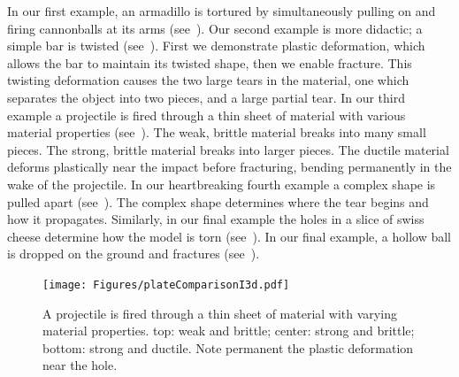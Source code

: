 \documentclass[conference]{acmsiggraph}
\begin{document}
In our first example, an armadillo is tortured by simultaneously pulling on and firing
cannonballs at its arms (see~).
Our second example is more didactic; a simple bar is twisted (see~).  First we demonstrate 
plastic deformation, which allows the bar to maintain its twisted shape, then we enable fracture.  This twisting deformation causes the two large tears in the material, one which separates the object into two pieces, and a large partial tear.
In our third example a projectile is fired through a thin sheet of material with various material properties (see~).  The weak, brittle material 
breaks into many small pieces.  The strong, brittle material breaks into larger pieces.  The ductile material deforms plastically near the impact before fracturing, bending permanently in the wake of the projectile.  
In our heartbreaking fourth example a complex shape is pulled apart (see~).  The complex shape determines
where the tear begins and how it propagates.  Similarly, in our final example the holes in a 
slice of swiss cheese determine how the model is torn (see~).
In our final example, a hollow ball is dropped on the ground and fractures (see~).




\begin{figure}[h!]
\texttt{[image: Figures/plateComparisonI3d.pdf]}
\caption{A projectile is fired through a thin sheet of material with varying material properties. top: weak and brittle; center: strong and brittle; bottom: strong and ductile.  Note permanent the plastic deformation near the hole.  }
\label{fig:projectile}
\end{figure}
\end{document}
